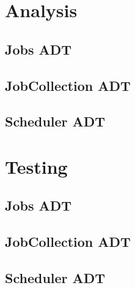 \documentclass[12pt,a4paper]{article}
\begin{document}
	\section{Analysis}
		\subsection{Jobs ADT}
		\subsection{JobCollection ADT}
		\subsection{Scheduler ADT}

	\section{Testing}
		\subsection{Jobs ADT}
		\subsection{JobCollection ADT}
		\subsection{Scheduler ADT}
\end{document}
